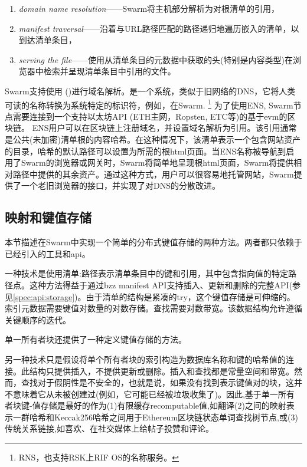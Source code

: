 \begin{enumerate}
    \item \emph{domain name resolution}——Swarm将主机部分解析为对根清单的引用，
    \item \emph{manifest traversal}——沿着与URL路径匹配的路径递归地遍历嵌入的清单，以到达清单条目，
    \item \emph{serving the file}——使用从清单条目的元数据中获取的头(特别是内容类型)在浏览器中检索并呈现清单条目中引用的文件。
\end{enumerate}

Swarm支持使用 ()进行域名解析。是一个系统，类似于旧网络的DNS，它将人类可读的名称转换为系统特定的标识符，例如，在Swarm.%
\footnote{RNS，也支持RSK上RIF OS的名称服务。}
%
为了使用ENS, Swarm节点需要连接到一个支持以太坊API (ETH主网，Ropsten, ETC等)的基于evm的区块链。 
ENS用户可以在区块链上注册域名，并设置域名解析为引用。该引用通常是公共(未加密)清单根的内容哈希。在这种情况下，该清单表示一个包含网站资产的目录，哈希的默认路径可以设置为所需的根html页面。当ENS名称被导航到启用了Swarm的浏览器或网关时，Swarm将简单地呈现根html页面，Swarm将提供相对路径中提供的其余资产。通过这种方式，用户可以很容易地托管网站，Swarm提供了一个老旧浏览器的接口，并实现了对DNS的分散改进。


\subsection{映射和键值存储\statusgreen}\label{sec:maps}

本节描述在Swarm中实现一个简单的分布式键值存储的两种方法。两者都只依赖于已经引入的工具和api。

一种技术是使用清单:路径表示清单条目中的键和引用，其中包含指向值的特定路径点。这种方法得益于通过bzz manifest API支持插入、更新和删除的完整API(参见\ref{spec:api:storage})。由于清单的结构是紧凑的try，这个键值存储是可伸缩的。索引元数据需要键值对数量的对数存储。查找需要对数带宽。该数据结构允许遵循关键顺序的迭代。

单一所有者块还提供了一种定义键值存储的方法。

另一种技术只是假设将单个所有者块的索引构造为数据库名称和键的哈希值的连接。此结构只提供插入，不提供更新或删除。插入和查找都是常量空间和带宽。然而，查找对于假阴性是不安全的，也就是说，如果没有找到表示键值对的块，这并不意味着它从未被创建过(例如，它可能已经被垃圾收集了)。因此,基于单一所有者块键-值存储是最好的作为(1)有限缓存recomputable值,如翻译(2)之间的映射表示一群哈希和Keccak256哈希之间用于Ethereum区块链状态单词查找树节点,或(3)传统关系链接,如喜欢、在社交媒体上给帖子投赞和评论。 


